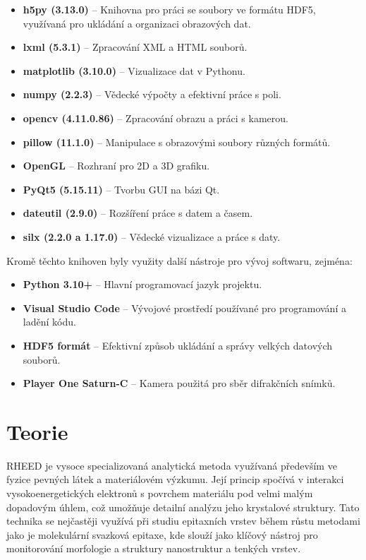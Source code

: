 \documentclass{article}
\begin{document}
\begin{itemize}
    \item \textbf{h5py (3.13.0)} – Knihovna pro práci se soubory ve formátu HDF5, využívaná pro ukládání a organizaci obrazových dat.
    \item \textbf{lxml (5.3.1)} – Zpracování XML a HTML souborů.
    \item \textbf{matplotlib (3.10.0)} – Vizualizace dat v Pythonu.
    \item \textbf{numpy (2.2.3)} – Vědecké výpočty a efektivní práce s poli.
    \item \textbf{opencv (4.11.0.86)} – Zpracování obrazu a práci s kamerou.
    \item \textbf{pillow (11.1.0)} – Manipulace s obrazovými soubory různých formátů.
    \item \textbf{OpenGL} – Rozhraní pro 2D a 3D grafiku.
    \item \textbf{PyQt5 (5.15.11)} – Tvorbu GUI na bázi Qt.
    \item \textbf{dateutil (2.9.0)} – Rozšíření práce s datem a časem.
    \item \textbf{silx (2.2.0 a 1.17.0)} – Vědecké vizualizace a práce s daty.
\end{itemize}

Kromě těchto knihoven byly využity další nástroje pro vývoj softwaru, zejména:

\begin{itemize}
    \item \textbf{Python 3.10+} – Hlavní programovací jazyk projektu.
    \item \textbf{Visual Studio Code} – Vývojové prostředí používané pro programování a ladění kódu.
    \item \textbf{HDF5 formát} – Efektivní způsob ukládání a správy velkých datových souborů.
    \item \textbf{Player One Saturn-C} – Kamera použitá pro sběr difrakčních snímků.
\end{itemize}

\newpage

\section{Teorie}
RHEED je vysoce specializovaná analytická metoda využívaná především ve fyzice pevných látek a materiálovém výzkumu. Její princip spočívá v interakci vysokoenergetických elektronů s povrchem materiálu pod velmi malým dopadovým úhlem, což umožňuje detailní analýzu jeho krystalové struktury. Tato technika se nejčastěji využívá při studiu epitaxních vrstev během růstu metodami jako je molekulární svazková epitaxe, kde slouží jako klíčový nástroj pro monitorování morfologie a struktury nanostruktur a tenkých vrstev.\\
\end{document}

